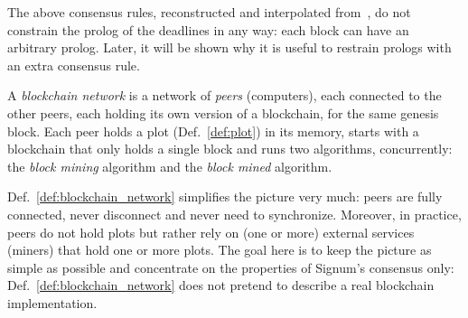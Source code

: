 %
The above consensus rules, reconstructed and interpolated
from~\cite{SignumPlotting,SignumSource},
do not constrain the prolog of the deadlines in any way:
each block can have an arbitrary prolog. Later, it will be shown why it is useful to
restrain prologs with an extra consensus rule.
%
\begin{definition}\label{def:blockchain_network}
  A \emph{blockchain network} is a
  network of \emph{peers} (computers), each connected to the other peers,
  each holding its own version of a blockchain, for the same genesis block.
  Each peer holds a plot (Def.~\ref{def:plot}) in its memory, starts with
  a blockchain that only holds a single block and runs two
  algorithms, concurrently: the \emph{block mining} algorithm
  and the \emph{block mined} algorithm.
\end{definition}
%
Def.~\ref{def:blockchain_network} simplifies the picture very much:
peers are fully connected, never disconnect and never need to synchronize.
Moreover, in practice, peers do not hold plots but rather rely on (one or more)
external services (miners) that hold one or more plots.
The goal here is to keep the picture as simple as possible and concentrate on the properties of
Signum's consensus only: Def.~\ref{def:blockchain_network} does not pretend
to describe a real blockchain implementation.

